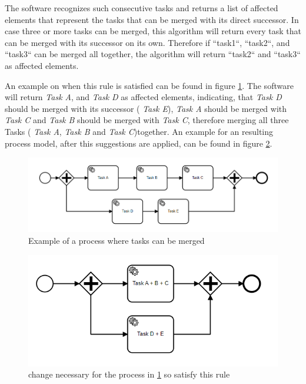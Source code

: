 The software recognizes such consecutive tasks and returns a list of affected elements that represent the tasks that can be merged with its direct successor. In case three or more tasks can be merged, this algorithm will return every task that can be merged with its successor on its own. Therefore if ``task1``, ``task2``, and ``task3`` can be merged all together, the algorithm will return ``task2`` and ``task3`` as affected elements.

An example on when this rule is satisfied can be found in figure \ref{fig:example-EX}. The software will return \textit{Task A},  and \textit{Task D} as affected elements, indicating, that  \textit{Task D} should be merged with its successor ( \textit{Task E}),  \textit{Task A} should be merged with  \textit{Task C} and  \textit{Task B} should be merged with  \textit{Task C}, therefore merging all three Tasks ( \textit{Task A}, \textit{Task B} and  \textit{Task C})together. An example for an resulting process model, after this suggestions are applied, can be found in figure \ref{fig:example-EX-fix}.

\begin{figure}[H]
	\centering
	\includegraphics[width=0.9\columnwidth]{graphics/merge-suggestion-1}
	\caption{Example of a process where tasks can be merged} 
	\label{fig:example-EX} 
\end{figure}

\begin{figure}[H]
	\centering
	\includegraphics[width=0.7\columnwidth]{graphics/merge-suggestion-2}
	\caption{change necessary for the process in \ref{fig:example-EX} so satisfy this rule} 
	\label{fig:example-EX-fix} 
\end{figure}

